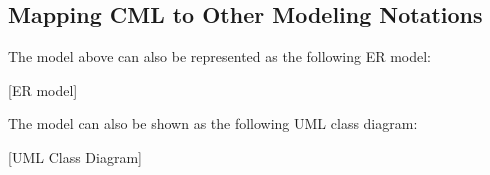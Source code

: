 \subsection{Mapping CML to Other Modeling Notations}\label{subsec:mapping}

The model above can also be represented as the following ER model:

[ER model]

The model can also be shown as the following UML class diagram:

[UML Class Diagram]
